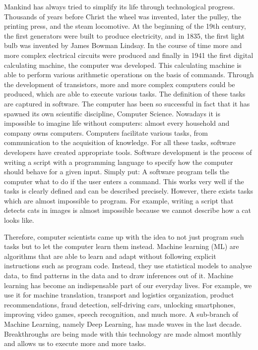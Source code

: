Mankind has always tried to simplify its life through technological progress.
Thousands of years before Christ the wheel was invented, later the pulley, the printing press, and the steam locomotive.
At the beginning of the 19th century, the first generators were built to produce electricity, and in 1835, the first light bulb was invented by James Bowman Lindsay.
In the course of time more and more complex electrical circuits were produced and finally in 1941 the first digital calculating machine, the computer was developed.
This calculating machine is able to perform various arithmetic operations on the basis of commands.
Through the development of transistors, more and more complex computers could be produced, which are able to execute various tasks.
The definition of these tasks are captured in software.
The computer has been so successful in fact that it has spawned its own scientific discipline, Computer Science.
Nowadays it is impossible to imagine life without computers: almost every household and company owns computers.
Computers facilitate various tasks, from communication to the acquisition of knowledge.
For all these tasks, software developers have created appropriate tools.
Software development is the process of writing a script with a programming language to specify how the computer should behave for a given input.
Simply put: A software program tells the computer what to do if the user enters a command.
This works very well if the tasks is clearly defined and can be described precisely.
However, there exists tasks which are almost impossible to program.
For example, writing a script that detects cats in images is almost impossible because we cannot describe how a cat looks like.

Therefore, computer scientists came up with the idea to not just program such tasks but to let the computer learn them instead.
Machine learning (ML) are algorithms that are able to learn and adapt without following explicit instructions such as program code.
Instead, they use statistical models to analyse data, to find patterns in the data and to draw inferences out of it.
Machine learning has become an indispensable part of our everyday lives.
For example, we use it for machine translation, transport and logistics organization, product recommendations, fraud detection, self-driving cars, unlocking smartphones, improving video games, speech recognition, and much more.
A sub-branch of Machine Learning, namely Deep Learning, has made waves in the last decade.
Breakthroughs are being made with this technology are made almost monthly and allows us to execute more and more tasks.

